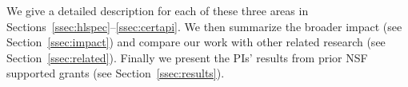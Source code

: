 %
\noindent{}We give a detailed description for each of these three
areas in Sections~\ref{ssec:hlspec}--\ref{ssec:certapi}. 
We then summarize the broader impact (see Section~\ref{ssec:impact}) 
and compare our work with other related research 
(see Section~\ref{ssec:related}). Finally we present the PIs' results 
from prior NSF supported grants (see Section~\ref{ssec:results}).


